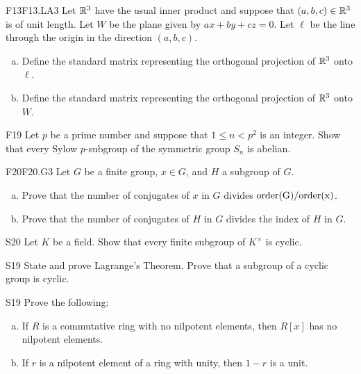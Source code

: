 \documentclass[../AlgebraQualSolutions.tex]{subfiles}
\begin{document}
\begin{prob}{F13}{F13.LA3}
	Let $\mathbb{R}^3$ have  the usual inner product and suppose that $(a,b,c) \in \mathbb{R}^3$ is of unit length. Let $W$ be the plane given by $ax + by + cz = 0$. Let $\ell$ be the line through the origin in the direction $(a,b,c)$.
	\begin{enumerate}[(a)]
		\item Define the standard matrix representing the orthogonal projection of $\mathbb{R}^3$ onto $\ell$.
		\item Define the standard matrix representing the orthogonal projection of $\mathbb{R}^3$ onto $W$.
	\end{enumerate}
\end{prob}

\begin{prob}{F19}{}
Let $p$ be a prime number and suppose that $1 \leq n <p^2$ is an integer. Show that every Sylow $p$-subgroup of the symmetric group $S_n$ is abelian.
\end{prob}


\begin{prob}{F20}{F20.G3}
Let $G$ be a finite group, $x \in G$, and $H$ a subgroup of $G$.
\begin{enumerate}[(a)]
\item Prove that the number of conjugates of $x$ in $G$ divides $\rm{order}(G)/\rm{order}(x)$.
\item Prove that the number of conjugates of $H$ in $G$ divides the index of $H$ in $G$.
\end{enumerate}
\end{prob}

\begin{prob}{S20}{}
Let $K$ be a field. Show that every finite subgroup of $K^\times$ is cyclic.
\end{prob}

\begin{prob}{S19}{}
State and prove Lagrange's Theorem. Prove that a subgroup of a cyclic group is cyclic.
\end{prob}

\begin{prob}{S19}{}
Prove the following:
\begin{enumerate}[(a)]
\item If $R$ is a commutative ring with no nilpotent elements, then $R[x]$ has no nilpotent elements.
\item If $r$ is a nilpotent element of a ring with unity, then $1 - r$ is a unit.
\end{enumerate}
\end{prob}
\end{document}
